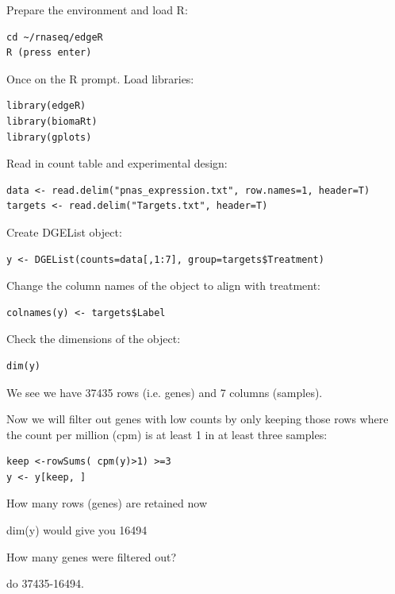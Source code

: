 \begin{steps}
Prepare the environment and load R:
\begin{lstlisting}
cd ~/rnaseq/edgeR
R (press enter)
\end{lstlisting}

Once on the R prompt. Load libraries:
\begin{lstlisting}
library(edgeR)
library(biomaRt)
library(gplots)
\end{lstlisting}

Read in count table and experimental design:
\begin{lstlisting}
data <- read.delim("pnas_expression.txt", row.names=1, header=T)
targets <- read.delim("Targets.txt", header=T)
\end{lstlisting}

Create DGEList object:
\begin{lstlisting}
y <- DGEList(counts=data[,1:7], group=targets$Treatment)
\end{lstlisting}

Change the column names of the object to align with treatment:
\begin{lstlisting}
colnames(y) <- targets$Label
\end{lstlisting}

Check the dimensions of the object:
\begin{lstlisting}
dim(y)
\end{lstlisting}

We see we have 37435 rows (i.e. genes) and 7 columns (samples).

Now we will filter out genes with low counts by only keeping those rows where the count
per million (cpm) is at least 1 in at least three samples:
\begin{lstlisting}
keep <-rowSums( cpm(y)>1) >=3
y <- y[keep, ]
\end{lstlisting}

\end{steps}

\begin{questions}
How many rows (genes) are retained now
\begin{answer}
dim(y) would give you 16494
\end{answer}

How many genes were filtered out?
\begin{answer}
do 37435-16494.
\end{answer}
\end{questions}

